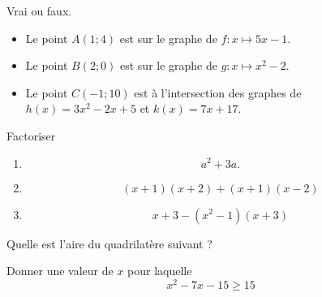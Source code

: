 \begin{MentalActivity}

    \begin{mental}
        Vrai ou faux.
        \begin{itemize}
            \item Le point \( A(1;4)\) est sur le graphe de \( f\colon x\mapsto 5x-1\).
            \item Le point \( B(2;0)\) est sur le graphe de \( g\colon x\mapsto x^2-2\).
            \item Le point \( C(-1;10)\) est à l'intersection  des graphes de \( h(x)=3x^2-2x+5\) et \( k(x)=7x+17\).
        \end{itemize}
    \end{mental}

    \begin{mental}
    Factoriser
    \begin{enumerate}
        \item
            \begin{equation*}
                a^2+3a.
            \end{equation*}
        \item
            \begin{equation*}
                (x+1)(x+2)+(x+1)(x-2)
            \end{equation*}
        \item 
    \begin{equation*}
        x+3-(x^2-1)(x+3)
    \end{equation*}
    \end{enumerate}
    \end{mental}

\begin{mental}
       
        Quelle est l'aire du quadrilatère suivant ?

        \begin{center}
            
        \end{center}

\end{mental}

\begin{mental}
    Donner une valeur de \( x\) pour laquelle 
    \begin{equation}
        x^2-7x-15\geq 15
    \end{equation}
\end{mental}


\end{MentalActivity}
